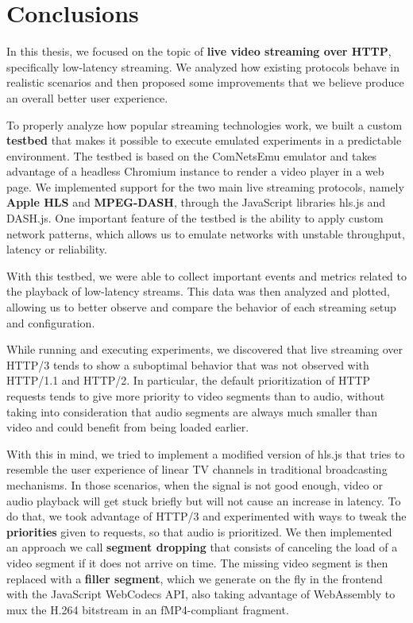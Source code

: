 \chapter{Conclusions}
\label{cha:conclusions}

In this thesis, we focused on the topic of \textbf{live video streaming over HTTP}, specifically low-latency streaming. We analyzed how existing protocols behave in realistic scenarios and then proposed some improvements that we believe produce an overall better user experience.

To properly analyze how popular streaming technologies work, we built a custom \textbf{testbed} that makes it possible to execute emulated experiments in a predictable environment. The testbed is based on the ComNetsEmu emulator and takes advantage of a headless Chromium instance to render a video player in a web page. We implemented support for the two main live streaming protocols, namely \textbf{Apple HLS} and \textbf{MPEG-DASH}, through the JavaScript libraries hls.js and DASH.js. One important feature of the testbed is the ability to apply custom network patterns, which allows us to emulate networks with unstable throughput, latency or reliability.

With this testbed, we were able to collect important events and metrics related to the playback of low-latency streams. This data was then analyzed and plotted, allowing us to better observe and compare the behavior of each streaming setup and configuration.

While running and executing experiments, we discovered that live streaming over HTTP/3 tends to show a suboptimal behavior that was not observed with HTTP/1.1 and HTTP/2. In particular, the default prioritization of HTTP requests tends to give more priority to video segments than to audio, without taking into consideration that audio segments are always much smaller than video and could benefit from being loaded earlier.

With this in mind, we tried to implement a modified version of hls.js that tries to resemble the user experience of linear TV channels in traditional broadcasting mechanisms. In those scenarios, when the signal is not good enough, video or audio playback will get stuck briefly but will not cause an increase in latency. To do that, we took advantage of HTTP/3 and experimented with ways to tweak the \textbf{priorities} given to requests, so that audio is prioritized. We then implemented an approach we call \textbf{segment dropping} that consists of canceling the load of a video segment if it does not arrive on time. The missing video segment is then replaced with a \textbf{filler segment}, which we generate on the fly in the frontend with the JavaScript WebCodecs API, also taking advantage of WebAssembly to mux the H.264 bitstream in an fMP4-compliant fragment.

